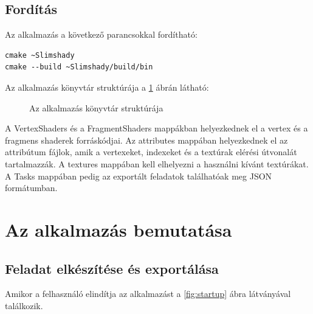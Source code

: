 \subsection{Fordítás}
Az alkalmazás a következő parancsokkal fordítható:
\begin{verbatim}
cmake ~Slimshady
cmake --build ~Slimshady/build/bin
\end{verbatim}

Az alkalmazás könyvtár struktúrája a \ref{fig:dirtree} ábrán látható:

\begin{figure}[hbt!]
    \centering
    \caption{Az alkalmazás könyvtár struktúrája}
    \label{fig:dirtree}
\end{figure}

A VertexShaders és a FragmentShaders mappákban helyezkednek el a vertex és a fragmens shaderek forráskódjai. Az attributes mappában helyezkednek el az attribútum fájlok, amik a vertexeket, indexeket és a textúrak elérési útvonalát tartalmazzák. A textures mappában kell elhelyezni a használni kívánt textúrákat. A Tasks mappában pedig az exportált feladatok találhatóak meg JSON formátumban.

\newpage

\section{Az alkalmazás bemutatása}

\subsection{Feladat elkészítése és exportálása}

Amikor a felhasználó elindítja az alkalmazást a \ref{fig:startup} ábra látványával találkozik.

